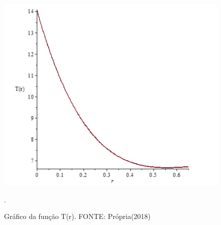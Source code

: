\begin{figure}[h]
\centering
\includegraphics[width=15cm]{figuras/grafico.png}
\caption{Gráfico da função T(r). FONTE: Própria(2018)}.
\label{figura 3:grafico}
\end{figure}




























